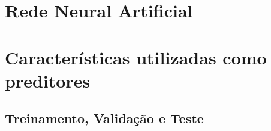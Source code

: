 

\section{Rede Neural Artificial}



\section{Características utilizadas como preditores}


\subsection{Treinamento, Validação e Teste}
